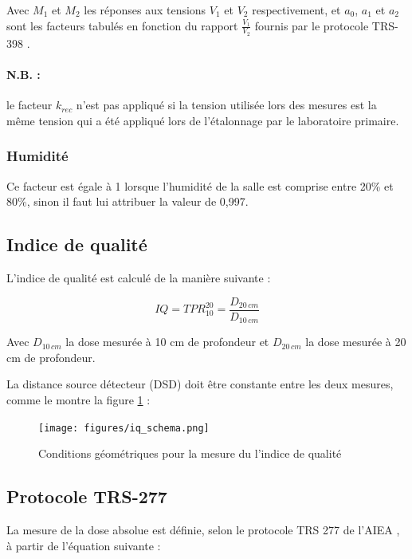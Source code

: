 \documentclass{article}
\begin{document}
Avec $M_1$ et $M_2$ les réponses aux tensions $V_1$ et $V_2$ respectivement, et $a_0$, $a_1$ et $a_2$ sont les facteurs tabulés en fonction du rapport $\frac{V_1}{V_2}$ fournis par le protocole TRS-398 \cite{international2001iaea}.

\paragraph*{N.B. :} le facteur $k_{rec}$ n'est pas appliqué si la tension utilisée lors des mesures est la même tension qui a été appliqué lors de l'étalonnage par le laboratoire primaire.

\subsubsection{Humidité}

Ce facteur est égale à 1 lorsque l'humidité de la salle est comprise entre 20\% et 80\%, sinon il faut lui attribuer la valeur de 0,997.

\subsection{Indice de qualité}

L'indice de qualité est calculé de la manière suivante :

\begin{equation}
  IQ = TPR^{20}_{10} = \dfrac{D_{20 \, cm}}{D_{10 \, cm}}
  \label{eq_iq}
\end{equation}

Avec $D_{10 \, cm}$ la dose mesurée à 10 cm de profondeur et $D_{20 \, cm}$ la dose mesurée à 20 cm de profondeur.

La distance source détecteur (DSD) doit être constante entre les deux mesures, comme le montre la figure \ref*{fig_tpr} :

\begin{figure}[h]
  \centering
  \texttt{[image: figures/iq\_schema.png]}
  \caption{Conditions géométriques pour la mesure du l'indice de qualité}
  \label{fig_tpr}
\end{figure}

\newpage
\subsection{Protocole TRS-277}

La mesure de la dose absolue est définie, selon le protocole TRS 277 de l'AIEA \cite{internationaliaea}, à partir de l'équation suivante :
\end{document}
